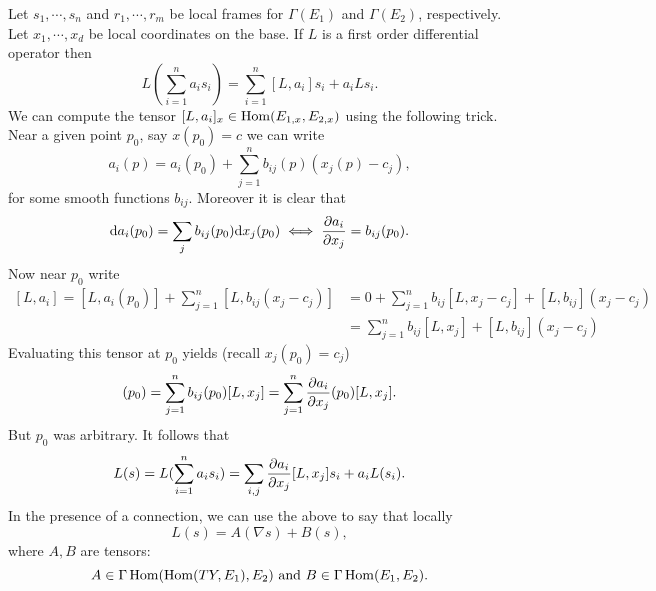 \documentclass{amsart}
\begin{document}
\begin{example}
  Let $s_{1},\cdots,s_{n}$ and $r_{1},\cdots,r_{m}$ be local frames for $\Gamma(E_{1})$ and $\Gamma(E_{2})$, respectively. Let $x_{1},\cdots,x_{d}$ be local coordinates on the base. If $L$ is a first order differential operator then
  \begin{equation*}
    L(\sum_{i=1}^{n}a_{i}s_{i})=\sum_{i=1}^{n}[L,a_{i}]s_{i}+a_{i}Ls_{i}.
  \end{equation*}
  We can compute the tensor $[L,a_{i}]_{x}\in \operatorname{\mathrm{Hom}}(E_{1,x},E_{2,x})$ using the following trick. Near a given point $p_{0}$, say $x(p_{0})=c$ we can write
  \begin{equation*}
    a_{i}(p)=a_{i}(p_{0})+\sum_{j=1}^{n}b_{ij}(p)(x_{j}(p)-c_{j}),
  \end{equation*}
  for some smooth functions $b_{ij}$. Moreover it is clear that
  \begin{equation*}
    \mathrm{d} a_{i}(p_{0})=\sum_{j}b_{ij}(p_{0})\mathrm{d} x_{j}(p_{0})\iff \frac{\partial a_{i}}{\partial x_{j}}=b_{ij}(p_{0}).
  \end{equation*}
  Now near $p_{0}$ write
  \begin{equation*}
    \begin{aligned}
      [L,a_{i}]=[L,a_{i}(p_{0})]+\sum_{j=1}^{n}[L,b_{ij}(x_{j}-c_{j})]&=0+\sum_{j=1}^{n}b_{ij}[L,x_{j}-c_{j}]+[L,b_{ij}](x_{j}-c_{j})\\
      &=\sum_{j=1}^{n}b_{ij}[L,x_{j}]+[L,b_{ij}](x_{j}-c_{j})
    \end{aligned}
      \end{equation*}
  Evaluating this tensor at $p_{0}$ yields (recall $x_{j}(p_{0})=c_{j}$) 
  \begin{equation*}
    [L,a_{i}](p_{0})=\sum_{j=1}^{n}b_{ij}(p_{0})[L,x_{j}]=\sum_{j=1}^{n}\pd{a_{i}}{x_{j}}(p_{0})[L,x_{j}].
  \end{equation*}
  But $p_{0}$ was arbitrary. It follows that
  \begin{equation*}
    L(s)=L(\sum_{i=1}^{n}a_{i}s_{i})=\sum_{i,j}\frac{\partial a_{i}}{\partial x_{j}}[L,x_{j}]s_{i}+a_{i}L(s_{i}).
  \end{equation*}
  In the presence of a connection, we can use the above to say that locally
  \begin{equation*}
    L(s)=A(\nabla s)+B(s),
  \end{equation*}
  where $A,B$ are tensors:
  \begin{equation*}
    A\in \Gamma \operatorname{\mathrm{Hom}}(\operatorname{\mathrm{Hom}}(TY,E_{1}),E_{2}) \text{ and }B\in \Gamma\operatorname{\mathrm{Hom}}(E_{1},E_{2}).
  \end{equation*}

\end{example}
\end{document}

